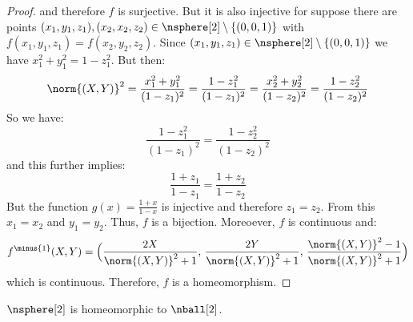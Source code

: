 \documentclass{book}                                                           %
\begin{document}
\begin{proof}
                    and therefore $f$ is surjective. But it is also injective
                    for suppose there are points
                    $(x_{1},y_{1},z_{1}),(x_{2},x_{2},z_{2})\in%
                    \nsphere[2]\setminus\{(0,0,1)\}$ with
                    $f(x_{1},y_{1},z_{1})=f(x_{2},y_{2},z_{2})$. Since
                    $(x_{1},y_{1},z_{1})\in\nsphere[2]\setminus\{(0,0,1)\}$ we
                    have $x_{1}^{2}+y_{1}^{2}=1-z_{1}^{2}$. But then:
                    \begin{equation}
                        \norm{(X,Y)}^{2}=\frac{x_{1}^2+y_{1}^2}{(1-z_{1})^{2}}
                            =\frac{1-z_{1}^{2}}{(1-z_{1})^{2}}
                            =\frac{x_{2}^{2}+y_{2}^{2}}{(1-z_{2})^{2}}
                            =\frac{1-z_{2}^{2}}{(1-z_{2})^{2}}
                    \end{equation}
                    So we have:
                    \begin{equation}
                        \frac{1-z_{1}^{2}}{(1-z_{1})^{2}}
                        =\frac{1-z_{2}^{2}}{(1-z_{2})^{2}}
                    \end{equation}
                    and this further implies:
                    \begin{equation}
                        \frac{1+z_{1}}{1-z_{1}}=\frac{1+z_{2}}{1-z_{2}}
                    \end{equation}
                    But the function $g(x)=\frac{1+x}{1-x}$ is injective and
                    therefore $z_{1}=z_{2}$. From this $x_{1}=x_{2}$ and
                    $y_{1}=y_{2}$. Thus, $f$ is a bijection. Moreoever, $f$ is
                    continuous and:
                    \begin{equation}
                        f^{\minus{1}}(X,Y)=\Big(%
                            \frac{2X}{\norm{(X,Y)}^{2}+1},\,
                            \frac{2Y}{\norm{(X,Y)}^{2}+1},\,
                            \frac{\norm{(X,Y)}^{2}-1}{\norm{(X,Y)}^{2}+1}%
                        \Big)
                    \end{equation}
                    which is continuous. Therefore, $f$ is a homeomorphism.
                \end{proof}
                \begin{theorem}
                    $\nsphere[2]$ is homeomorphic to $\nball[2]$.
                \end{theorem}
\end{document}
